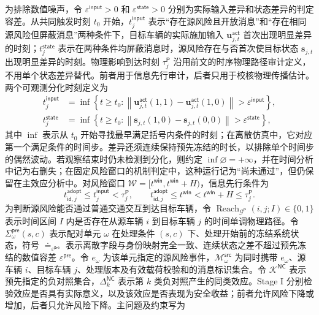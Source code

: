 \documentclass[10pt,a4paper,twocolumn]{article}
\begin{document}
为排除数值噪声，令 $\varepsilon^{\mathsf{input}}>0$ 和 $\varepsilon^{\mathsf{state}}>0$ 分别为实际输入差异和状态差异的判定容差。从共同触发时刻 $t_0$ 开始，$t_j^{\mathsf{input}}$ 表示“存在源风险且开放消息”和“存在相同源风险但屏蔽消息”两种条件下，目标车辆的实际施加输入 $\mathbf u_{j,t}^{\mathsf{act}}$ 首次出现明显差异的时刻；$t_j^{\mathsf{state}}$ 表示在两种条件均屏蔽消息时，源风险存在与否首次使目标状态 $\mathbf s_{j,t}$ 出现明显差异的时刻。物理影响到达时刻 $\tau_j^{\mathsf P}$ 沿用前文的时序物理路径审计定义，不用单个状态差异替代。前者用于信息先行审计，后者只用于校核物理传播估计。两个可观测分化时刻定义为
\begin{equation}
\begin{aligned}
t_j^{\mathsf{input}}&=\inf\left\{t\geq t_0:\left\|\mathbf u_{j,t}^{\mathsf{act}}(1,1)-\mathbf u_{j,t}^{\mathsf{act}}(1,0)\right\|>\varepsilon^{\mathsf{input}}\right\},\\
t_j^{\mathsf{state}}&=\inf\left\{t\geq t_0:\left\|\mathbf s_{j,t}(1,0)-\mathbf s_{j,t}(0,0)\right\|>\varepsilon^{\mathsf{state}}\right\},
\end{aligned}
\end{equation}
其中 $\inf$ 表示从 $t_0$ 开始寻找最早满足括号内条件的时刻；在离散仿真中，它对应第一个满足条件的时间步。差异还须连续保持预先冻结的时长，以排除单个时间步的偶然波动。若观察结束时仍未检测到分化，则约定 $\inf\varnothing=+\infty$，并在时间分析中记为右删失；在固定风险窗口的机制判定中，这种运行记为“尚未通过”，但仍保留在主效应分析中。对风险窗口 $\mathcal W=[t^{\mathsf{win}},t^{\mathsf{win}}+H)$，信息先行条件为
\begin{equation}
t_{\mathsf{id},j}^{\mathsf{adopt}}\leq t_j^{\mathsf{input}}<\tau_j^{\mathsf P},\qquad
t_{\mathsf{id},j}^{\mathsf{adopt}}\leq t^{\mathsf{win}}<t^{\mathsf{win}}+H\leq\tau_j^{\mathsf P}.
\end{equation}
为判断源风险能否通过普通交通交互到达目标车辆，令 $\operatorname{Reach}_{\mathcal G^{\mathsf P}}(i,j;I)\in\{0,1\}$ 表示时间区间 $I$ 内是否存在从源车辆 $i$ 到目标车辆 $j$ 的时间单调物理路径。令 $\Sigma_{\omega}^{\mathsf{pre}}(s,c)$ 表示配对单元 $\omega$ 在处理条件 $(s,c)$ 下、处理开始前的冻结系统状态，符号 $\doteq_{\varepsilon^{\mathsf{pre}}}$ 表示离散字段与身份映射完全一致、连续状态之差不超过预先冻结的数值容差 $\varepsilon^{\mathsf{pre}}$。令 $e_\omega$ 为该单元指定的源风险事件，$\mathcal M_{\omega}^{\mathsf{src}}$ 为同时携带 $e_\omega$、源车辆 $i$、目标车辆 $j$、处理版本及有效载荷校验和的消息标识集合。令 $\mathcal K^{\mathsf{NC}}$ 表示预先指定的负对照集合，$\Delta_{k}^{\mathsf{NC}}$ 表示第 $k$ 类负对照产生的同类效应。Stage I 分别检验效应是否具有实际意义，以及该效应是否表现为安全收益；前者允许风险下降或增加，后者只允许风险下降。主问题及约束写为
\end{document}
